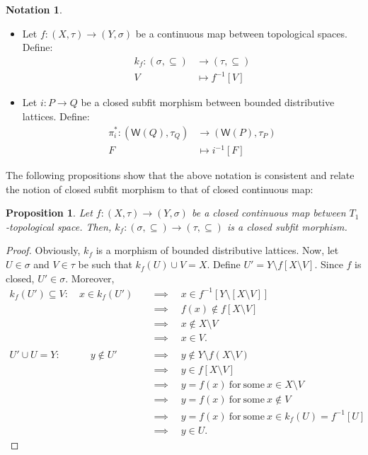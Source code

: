 \documentclass{article}
\newcommand{\corn}[1]{(\mathsf{W}(#1),\tau_{#1})}
\theoremstyle{plain}
\newtheorem{proposition}[theorem]{Proposition}
\theoremstyle{definition}
\newtheorem{notation}[theorem]{Notation}
\theoremstyle{remark}
\newcommand{\0}{\mathbbm 0}
\newcommand{\1}{\mathbbm 1}
\newcommand{\2}{\mathbbm 2}
\begin{document}
\begin{notation} $ $
     \begin{itemize}
 \item  Let $f:(X,\tau) \to (Y,\sigma)$  be a continuous map between topological spaces.
Define: \begin{align*}
    k_f: (\sigma, \subseteq) &\to (\tau, \subseteq) \\ V & \mapsto f^{-1}[V]
\end{align*}
 

    \item Let $i:P \to Q$ be a closed subfit morphism between bounded distributive lattices. Define: \begin{align*}
     \pi^*_i:\corn{Q} & \to\corn{P} \\ F  & \mapsto i^{-1}[F]
 \end{align*}

\end{itemize}
\end{notation}

The following propositions show that the above notation is consistent and relate the notion of closed subfit morphism to that of closed continuous map:


\begin{proposition}
\label{prop:k_fmorphism}
    Let $f: (X, \tau) \to (Y, \sigma)$ be a closed continuous map between  $T_1$-topological space. Then, $k_f: (\sigma, \subseteq) \to (\tau, \subseteq)$ is a closed  subfit morphism. 
\end{proposition}
\begin{proof}
    Obviously, $k_f$ is a morphism of bounded distributive lattices. Now, let $U \in \sigma$ and $V \in \tau$ be such that $k_f(U) \cup V = X$. Define $U'= Y \setminus f[X \setminus V]$. Since $f$ is closed, $U' \in \sigma$. Moreover,
    \begin{align*}
    k_f(U') \subseteq V : \quad    x \in k_f(U') \quad &\implies \quad x \in  f^{-1}[Y \setminus [X \setminus V]] \\ \quad &\implies \quad f(x) \notin  f[X \setminus V] \\  &\implies \quad x \notin X \setminus V \\  &\implies \quad x \in V.  
 \\ \\
    U' \cup U = Y : \quad  \quad \quad    y \notin U' \quad &\implies \quad y \notin Y \setminus f(X \setminus V)\\
        &\implies \quad y \in f[X \setminus V]  \\
         &\implies \quad y=f(x) \ \mathrm{ for \ some } \  x \in X \setminus V
          \\
          &\implies \quad y=f(x) \ \mathrm{ for \ some } \  x \notin  V \\  &\implies \quad y=f(x) \ \mathrm{ for \ some } \  x \in  k_f(U)=f^{-1}[U] \\
            &\implies \quad y \in U. 
    \end{align*}
    \end{proof}
\end{document}
